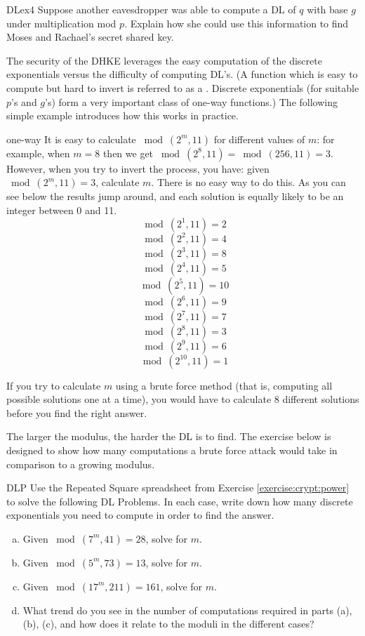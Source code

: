 \begin{exercise}{DLex4}
Suppose another eavesdropper was able to compute a DL of $q$ with base $g$ under multiplication mod $p$.  Explain how she could use this information to find Moses and Rachael's secret shared key.
\end{exercise}

The security of the DHKE leverages the easy computation of the discrete exponentials versus the difficulty of computing DL's. (A function which is easy to compute but hard to invert is referred to as a . Discrete exponentials (for suitable $p$'s and $g$'s) form a very important class of one-way functions.)
The following simple example introduces how this works in practice. 

\begin{example}{one-way}
It is easy to calculate $\bmod(2^{m},  11)$ for different values of $m$: for example, when $m =8$ then we get $\bmod(2^{8},  11) =\bmod(256,  11)  = 3$.  However, when you try to invert the process, you have: given $\bmod(2^{m},  11) = 3$, calculate $m$. There is no easy way to do this. As you can see below the results jump around, and each solution is equally likely to be an integer between 0 and 11. 
$$ \bmod(2^{1}, 11)=2$$
$$ \bmod(2^{2}, 11)=4$$
$$ \bmod(2^{3}, 11)=8$$
$$ \bmod(2^{4}, 11)=5$$
$$ \bmod(2^{5}, 11)=10$$
$$ \bmod(2^{6}, 11)=9$$
$$ \bmod(2^{7}, 11)=7$$
$$ \bmod(2^{8}, 11)=3$$
$$ \bmod(2^{9}, 11)=6$$
$$ \bmod(2^{10}, 11)=1$$
\end{example}
If you try to calculate $m$ using a brute force method (that is, computing all possible solutions one at a time), you would have to calculate 8 different solutions before you find the right answer. 

The larger the modulus, the harder the DL is to find. The exercise below is designed to show how many computations a brute force attack would take in comparison to a growing modulus.

\begin{exercise}{DLP}
Use the Repeated Square spreadsheet from Exercise \ref{exercise:crypt:power} to solve the following DL Problems. In each case, write down how many discrete exponentials you need to compute in order to find the answer.  
\begin{enumerate}[(a)]
\item Given $ \bmod(7^{m}, 41)=28$, solve for $m$.

\item Given $ \bmod(5^{m}, 73)=13$, solve for $m$.

\item Given $ \bmod(17^{m}, 211)=161$, solve for $m$.

\item
What trend do you see in the number of computations required in parts (a), (b), (c), and how does it relate to the moduli in the different cases?
\end{enumerate}
\end{exercise}

